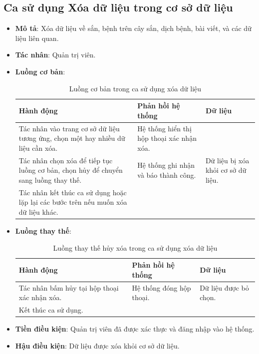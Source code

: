 \documentclass[./../main.tex]{subfiles}
\begin{document}
\subsection{Ca sử dụng Xóa dữ liệu trong cơ sở dữ liệu}
\begin{itemize}
    \item \textbf{Mô tả}: Xóa dữ liệu về sắn, bệnh trên cây sắn, dịch bệnh, bài viết, và các dữ liệu liên quan.
    \item \textbf{Tác nhân}: Quản trị viên.
    \item \textbf{Luồng cơ bản}:
    \begin{table}[H]
    \caption{\label{uc-49}Luồng cơ bản trong ca sử dụng xóa dữ liệu}
    \begin{tabularx}{\textwidth}{| X | X | X |}
        \hline
        \textbf{Hành động} & \textbf{Phản hồi hệ thống} & \textbf{Dữ liệu} 
        \\ \hline
         Tác nhân vào trang cơ sở dữ liệu tương ứng, chọn một hay nhiều dữ liệu cần xóa. & Hệ thống hiển thị hộp thoại xác nhận xóa. & 
        \\ \hline
        Tác nhân chọn xóa để tiếp tục luồng cơ bản, chọn hủy để chuyển sang luồng thay thế. & Hệ thống ghi nhận và báo thành công. & Dữ liệu bị xóa khỏi cơ sở dữ liệu.
        \\ \hline
        Tác nhân kết thúc ca sử dụng hoặc lặp lại các bước trên nếu muốn xóa dữ liệu khác. & &
        \\ \hline
    \end{tabularx}
    \end{table}    
    \item \textbf{Luồng thay thế}: 
        \begin{table}[H]
        \caption{\label{uc-50}Luồng thay thế hủy xóa trong ca sử dụng xóa dữ liệu}
        \begin{tabularx}{\textwidth}{| X | X | X |}
            \hline
            \textbf{Hành động} & \textbf{Phản hồi hệ thống} & \textbf{Dữ liệu} \\ \hline
            Tác nhân bấm hủy tại hộp thoại xác nhận xóa. & Hệ thống đóng hộp thoại. & Dữ liệu được bỏ chọn.
            \\ \hline
            Kết thúc ca sử dụng. & &
            \\ \hline
        \end{tabularx}
        \end{table}
    \item \textbf{Tiền điều kiện}: Quản trị viên đã được xác thực và đăng nhập vào hệ thống.
    \item \textbf{Hậu điều kiện}: Dữ liệu được xóa khỏi cơ sở dữ liệu.
\end{itemize}
\end{document}
